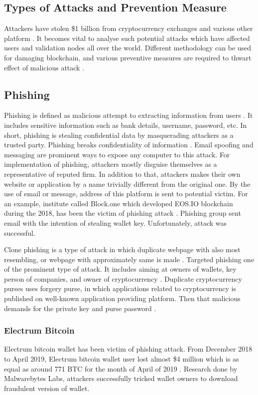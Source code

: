 \documentclass[a4paper,twoside,12pt]{report}
\begin{document}
\begin{spacing}{1.5}
\section{Types of Attacks and Prevention Measure}
\label{typesofattacks}
Attackers have stolen \$1 billion from cryptocurrency exchanges and various other platform \cite{topfiveblockchainsecurityissues}. It becomes vital to analyse such potential attacks which have affected users and validation nodes all over the world. Different methodology can be used for damaging blockchain, and various preventive measures are required to thwart effect of malicious attack \cite{blockchainthreatreport}. 
\subsection{Phishing}
Phishing is defined as malicious attempt to extracting information from users \cite{wiki:phishing}. It includes sensitive information such as bank details, username, password, etc. In short, phishing is stealing confidential data by  masquerading attackers as a trusted party. Phishing breaks confidentiality of information \cite{andryukhinphishing}. Email spoofing and messaging are prominent ways to expose any computer to this attack. For implementation of phishing, attackers mostly disguise themselves as a representative of reputed firm. In addition to that, attackers makes their own website or application by a name trivially different from the original one. By the use of email or message, address of this platform is sent to potential victim. For an example, institute called Block.one which developed EOS.IO blockchain during the 2018, has been the victim of phishing attack \cite{wiki:phishing}. Phishing group sent email with the intention of stealing wallet key. Unfortunately, attack was successful. 
\par
Clone phishing is a type of attack in which duplicate webpage with also most resembling, or webpage with approximately same is made \cite{andryukhinphishing,phishingkaspersky}. Targeted phishing one of the prominent type of attack. It includes aiming at owners of wallets, key person of companies, and owner of cryptocurrency \cite{aimedphising,andryukhinphishing}. Duplicate cryptocurrency purses uses forgery purse, in which applications related to cryptocurrency is published on well-known application providing platform. Then that malicious demands for the private key and purse password \cite{andryukhinphishing}.          
\subsubsection{Electrum Bitcoin}
Electrum bitcoin wallet has been victim of phishing attack. From December 2018 to April 2019, Electrum bitcoin wallet user lost almost \$4 million which is as equal as around 771 BTC for the month of April of 2019
\cite{phishing_perez_behind_2019}. Research done by Malwarebytes Labs, attackers successfully tricked wallet owners to download fraudulent version of wallet.  

\end{spacing}
\end{document}
